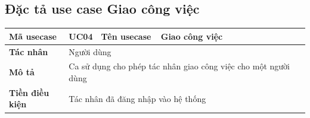 \documentclass[../DoAn.tex]{subfiles}
\begin{document}
\newpage

\subsection{Đặc tả use case Giao công việc}
\label{subsection:2.3.4}

\begin{table}[ht]
    \renewcommand{\arraystretch}{1.2}
    \centering
    \begin{tabular}{| p{0.2\linewidth} | p{0.1\linewidth} | p{0.2\linewidth} | p{0.5\linewidth} |}
        \hline
        \textbf{Mã usecase}                                          & UC04                                                                                               & \textbf{Tên usecase}                                       & Giao công việc                                                                                                                 \\ \hline
        \multicolumn{1}{|p{0.2\linewidth}|}{\textbf{Tác nhân}}       & \multicolumn{3}{p{0.8\linewidth}|}{Người dùng}                                                                                                                                                                                                                                                   \\ \hline
        \multicolumn{1}{|p{0.2\linewidth}|}{\textbf{Mô tả}}          & \multicolumn{3}{p{0.8\linewidth}|}{Ca sử dụng cho phép tác nhân giao công việc cho một người dùng}                                                                                                                                                                                               \\ \hline
        \multicolumn{1}{|p{0.2\linewidth}|}{\textbf{Tiền điều kiện}} & \multicolumn{3}{p{0.8\linewidth}|}{Tác nhân đã đăng nhập vào hệ thống}                                                                                                                                                                                                                           \\ \hline


\end{tabular}
\end{table}
\end{document}
